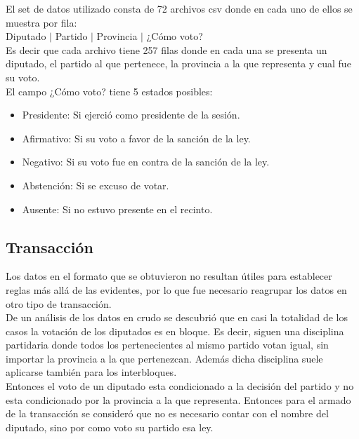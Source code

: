 \documentclass{endm}
\begin{document}
El set de datos utilizado consta de 72 archivos csv donde en cada uno de ellos se muestra por fila: \\

Diputado $|$ Partido $|$ Provincia $|$ ¿Cómo voto?\\

Es decir que cada archivo tiene 257 filas donde en cada una se presenta un diputado, el partido al que pertenece, la provincia a la que representa y cual fue su voto.\\

El campo ¿Cómo voto? tiene 5 estados posibles:\\

\begin{itemize}
\item Presidente: Si ejerció como presidente de la sesión.
\item Afirmativo: Si su voto a favor de la sanción de la ley.
\item Negativo: Si su voto fue en contra de la sanción de la ley.
\item Abstención: Si se excuso de votar.
\item Ausente: Si no estuvo presente en el recinto.
\end{itemize}

\subsection{Transacción}

Los datos en el formato que se obtuvieron no resultan útiles para establecer reglas más allá de las evidentes, por lo que fue necesario reagrupar los datos en otro tipo de transacción. \\

De un análisis de los datos en crudo se descubrió que en casi la totalidad de los casos la votación de los diputados es en bloque. Es decir, siguen una disciplina partidaria donde todos los pertenecientes al mismo partido votan igual, sin importar la provincia a la que pertenezcan. Además dicha disciplina suele aplicarse también para los interbloques. \\

Entonces el voto de un diputado esta condicionado a la decisión del partido y no esta condicionado por la provincia a la que representa. Entonces para el armado de la transacción se consideró que no es necesario contar con el nombre del diputado, sino por como voto su partido esa ley. \\
\end{document}

